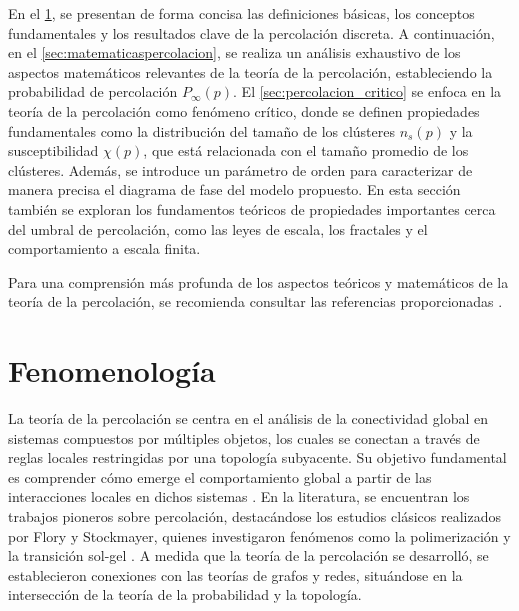 En el \cref{sec:fenomenologia}, se presentan de forma concisa las definiciones básicas, los conceptos fundamentales y los resultados clave de la percolación discreta. A continuación, en el \cref{sec:matematicaspercolacion}, se realiza un análisis exhaustivo de los aspectos matemáticos relevantes de la teoría de la percolación, estableciendo la probabilidad de percolación $P_\infty(p)$. El \cref{sec:percolacion_critico} se enfoca en la teoría de la percolación como fenómeno crítico, donde se definen propiedades fundamentales como la distribución del tamaño de los clústeres $n_s(p)$ y la susceptibilidad $\chi(p)$, que está relacionada con el tamaño promedio de los clústeres. Además, se introduce un parámetro de orden para caracterizar de manera precisa el diagrama de fase del modelo propuesto. En esta sección también se exploran los fundamentos teóricos de propiedades importantes cerca del umbral de percolación, como las leyes de escala, los fractales y el comportamiento a escala finita.

Para una comprensión más profunda de los aspectos teóricos y matemáticos de la teoría de la percolación, se recomienda consultar las referencias proporcionadas \cite{dorogovtsev_critical_2008,rong_estimation_2022,newman_networks_2018,ariel_percolation,Hugo_percolation,hammersley_percolation_1980,bunde_fractals_2012,grimmett_probability_2018,albert_statistical_2002,boccaletti_structure_2014}.


\section{Fenomenología}\label{sec:fenomenologia}


La teoría de la percolación se centra en el análisis de la conectividad global en sistemas compuestos por múltiples objetos, los cuales se conectan a través de reglas locales restringidas por una topología subyacente. Su objetivo fundamental es comprender cómo emerge el comportamiento global a partir de las interacciones locales en dichos sistemas \cite{hunt_percolation_2014}. En la literatura, se encuentran los trabajos pioneros sobre percolación, destacándose los estudios clásicos realizados por Flory y Stockmayer, quienes investigaron fenómenos como la polimerización y la transición sol-gel \cite{flory_molecular_1941,stockmayer_theory_2004}. A medida que la teoría de la percolación se desarrolló, se establecieron conexiones con las teorías de grafos y redes, situándose en la intersección de la teoría de la probabilidad y la topología.

